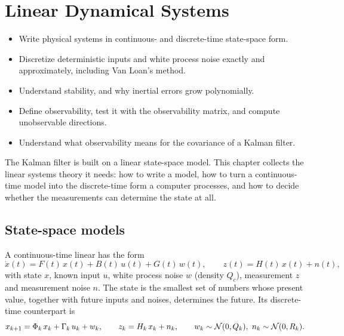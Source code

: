 \chapter{Linear Dynamical Systems}
\label{ch:linsys}

\begin{objectives}
\begin{itemize}
  \item Write physical systems in continuous- and discrete-time state-space form.
  \item Discretize deterministic inputs and white process noise exactly and approximately, including Van Loan's method.
  \item Understand stability, and why inertial errors grow polynomially.
  \item Define observability, test it with the observability matrix, and compute unobservable directions.
  \item Understand what observability means for the covariance of a Kalman filter.
\end{itemize}
\end{objectives}

The Kalman filter is built on a linear state-space model. This chapter collects the linear systems theory it needs: how to write a model, how
to turn a continuous-time model into the discrete-time form a computer processes, and how to decide whether the measurements can determine the
state at all.

\section{State-space models}

A continuous-time linear  has the form
\begin{equation}
  \dot x(t) = F(t)\,x(t) + B(t)\,u(t) + G(t)\,w(t), \qquad z(t) = H(t)\,x(t) + n(t),
  \label{eq:ct-model}
\end{equation}
with state $x$, known input $u$, white process noise $w$ (density $Q_c$), measurement $z$ and measurement noise $n$. The state is the smallest set of
numbers whose present value, together with future inputs and noises, determines the future. Its discrete-time counterpart is
\begin{equation}
  x_{k+1} = \Phi_k\,x_k + \Gamma_k\,u_k + w_k, \qquad z_k = H_k\,x_k + n_k,
  \qquad w_k \sim \mathcal{N}(0, Q_k),\ n_k \sim \mathcal{N}(0, R_k).
  \label{eq:dt-model}
\end{equation}

